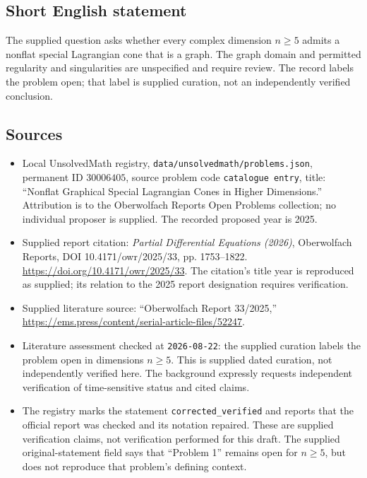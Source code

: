 \documentclass[11pt]{article}
\begin{document}
\subsection{Short English statement}
The supplied question asks whether every complex dimension \(n\geq5\) admits a nonflat special Lagrangian cone that is a graph. The graph domain and permitted regularity and singularities are unspecified and require review. The record labels the problem open; that label is supplied curation, not an independently verified conclusion.
\subsection{Sources}
\begin{itemize}
\item Local UnsolvedMath registry, \texttt{data/unsolvedmath/problems.json}, permanent ID \(30006405\), source problem code \texttt{catalogue entry}, title: ``Nonflat Graphical Special Lagrangian Cones in Higher Dimensions.'' Attribution is to the Oberwolfach Reports Open Problems collection; no individual proposer is supplied. The recorded proposed year is 2025.
\item Supplied report citation: \emph{Partial Differential Equations (2026)}, Oberwolfach Reports, DOI 10.4171/owr/2025/33, pp. 1753--1822. \url{https://doi.org/10.4171/owr/2025/33}. The citation's title year is reproduced as supplied; its relation to the 2025 report designation requires verification.
\item Supplied literature source: ``Oberwolfach Report 33/2025,'' \url{https://ems.press/content/serial-article-files/52247}.
\item Literature assessment checked at \texttt{2026-08-22}: the supplied curation labels the problem open in dimensions \(n\geq5\). This is supplied dated curation, not independently verified here. The background expressly requests independent verification of time-sensitive status and cited claims.
\item The registry marks the statement \texttt{corrected\_verified} and reports that the official report was checked and its notation repaired. These are supplied verification claims, not verification performed for this draft. The supplied original-statement field says that ``Problem 1'' remains open for \(n\geq5\), but does not reproduce that problem's defining context.
\end{itemize}
\end{document}

